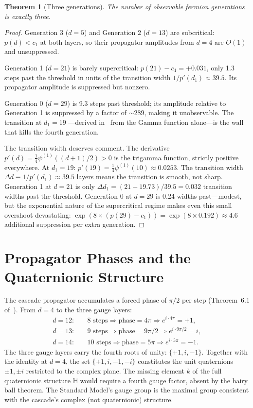 \documentclass[12pt,a4paper]{article}
\newtheorem{theorem}{Theorem}[section]
\begin{document}
\begin{theorem}[Three generations]\label{thm:generations}
The number of observable fermion generations is exactly three.
\end{theorem}
\begin{proof}
Generation 3 ($d=5$) and Generation 2 ($d=13$) are subcritical: $p(d)<c_1$ at both layers,
so their propagator amplitudes from $d=4$ are $O(1)$ and unsuppressed.

Generation 1 ($d=21$) is barely supercritical: $p(21)-c_1=+0.031$, only 1.3 steps past
the threshold in units of the transition width $1/p'(d_1)\approx 39.5$. Its propagator
amplitude is suppressed but nonzero.

Generation 0 ($d=29$) is 9.3 steps past threshold; its amplitude relative to Generation 1
is suppressed by a factor of $\sim 289$, making it unobservable. The transition at $d_1=19$
---derived in~\cite{paperI} from the Gamma function alone---is the wall that kills the
fourth generation.

The transition width deserves comment. The derivative $p'(d)=\tfrac{1}{4}\psi^{(1)}
((d+1)/2)>0$ is the trigamma function, strictly positive everywhere. At $d_1=19$:
$p'(19)=\tfrac{1}{4}\psi^{(1)}(10)\approx 0.0253$. The transition width
$\Delta d\equiv 1/p'(d_1)\approx 39.5$ layers means the transition is smooth, not sharp.
Generation 1 at $d=21$ is only $\Delta d_1=(21-19.73)/39.5=0.032$ transition widths past
the threshold. Generation 0 at $d=29$ is 0.24 widths past---modest, but the exponential
nature of the supercritical regime makes even this small overshoot devastating:
$\exp(8\times(p(29)-c_1))=\exp(8\times 0.192)\approx 4.6$ additional suppression per extra
generation.
\end{proof}

\section{Propagator Phases and the Quaternionic Structure}

The cascade propagator accumulates a forced phase of $\pi/2$ per step
(Theorem~6.1 of~\cite{paperII}). From $d=4$ to the three gauge layers:
\begin{align*}
d=12:&\quad 8 \text{ steps}\Rightarrow \text{phase}=4\pi \Rightarrow e^{i\cdot 4\pi}=+1,\\
d=13:&\quad 9 \text{ steps}\Rightarrow \text{phase}=9\pi/2 \Rightarrow e^{i\cdot 9\pi/2}=i,\\
d=14:&\quad 10 \text{ steps}\Rightarrow \text{phase}=5\pi \Rightarrow e^{i\cdot 5\pi}=-1.
\end{align*}
The three gauge layers carry the fourth roots of unity: $\{+1,i,-1\}$. Together with the
identity at $d=4$, the set $\{+1,i,-1,-i\}$ constitutes the unit quaternions $\pm 1,\pm i$
restricted to the complex plane. The missing element $k$ of the full quaternionic structure
$\mathbb{H}$ would require a fourth gauge factor, absent by the hairy ball theorem. The
Standard Model's gauge group is the maximal group consistent with the cascade's complex
(not quaternionic) structure.
\end{document}
